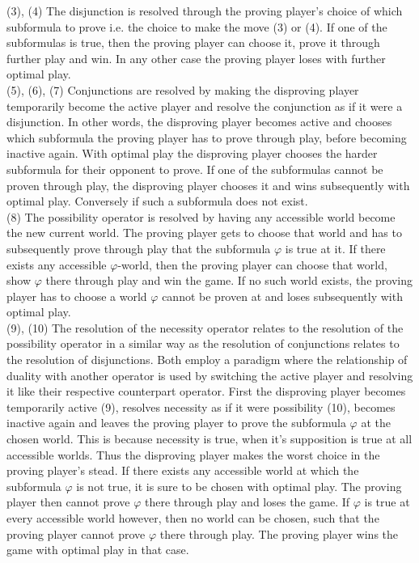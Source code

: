 \documentclass[a4paper,american,10pt]{paper}
\theoremstyle{definition}\newtheorem{definition}{Definition}
\begin{document}
\indent (3), (4) The disjunction is resolved through the proving player's choice of which subformula to prove i.e. the choice to make the move (3) or (4). If one of the subformulas is true, then the proving player can choose it, prove it through further play and win. In any other case the proving player loses with further optimal play.\\
\indent (5), (6), (7) Conjunctions are resolved by making the disproving player temporarily become the active player and resolve the conjunction as if it were a disjunction. In other words, the disproving player becomes active and chooses which subformula the proving player has to prove through play, before becoming inactive again. With optimal play the disproving player chooses the harder subformula for their opponent to prove. If one of the subformulas cannot be proven through play, the disproving player chooses it and wins subsequently with optimal play. Conversely if such a subformula does not exist.\\
\indent (8) The possibility operator is resolved by having any accessible world become the new current world. The proving player gets to choose that world and has to subsequently prove through play that the subformula $\varphi$ is true at it. If there exists any accessible $\varphi$-world, then the proving player can choose that world, show $\varphi$ there through play and win the game. If no such world exists, the proving player has to choose a world $\varphi$ cannot be proven at and loses subsequently with optimal play.\\
\indent (9), (10) The resolution of the necessity operator relates to the resolution of the possibility operator in a similar way as the resolution of conjunctions relates to the resolution of disjunctions. Both employ a paradigm where the relationship of duality with another operator is used by switching the active player and resolving it like their respective counterpart operator. First the disproving player becomes temporarily active (9), resolves necessity as if it were possibility (10), becomes inactive again and leaves the proving player to prove the subformula $\varphi$ at the chosen world. This is because necessity is true, when it's supposition is true at all accessible worlds. Thus the disproving player makes the worst choice in the proving player's stead. If there exists any accessible world at which the subformula $\varphi$ is not true, it is sure to be chosen with optimal play. The proving player then cannot prove $\varphi$ there through play and loses the game. If $\varphi$ is true at every accessible world however, then no world can be chosen, such that the proving player cannot prove $\varphi$ there through play. The proving player wins the game with optimal play in that case.\\
\end{document}
